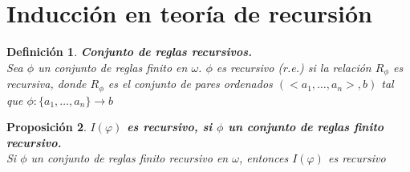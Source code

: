 \documentclass[executivepaper]{article}
\newtheorem{propo}{Proposición}[section]
\newtheorem{defi}[propo]{Definición}
\begin{document}
\newpage
\section{Inducción en teoría de recursión}
\begin{defi} \textbf{Conjunto de reglas recursivos.}\\
    Sea $\phi$ un conjunto de reglas finito en $\omega$. $\phi$ es recursivo (r.e.) si la relación $R_{\phi}$ es recursiva, donde  $R_{\phi}$ es el conjunto de pares ordenados $(<a_1,\ldots, a_n>,b)$ tal que $\phi: \{a_1,\ldots, a_n\}\rightarrow b$
\end{defi}

\begin{propo} \textbf{$I(\varphi)$ es recursivo, si $\phi$ un conjunto de reglas finito recursivo.}\\
    Si $\phi$ un conjunto de reglas finito recursivo en $\omega$, entonces $I(\varphi)$ es recursivo
\end{propo}
\end{document}
